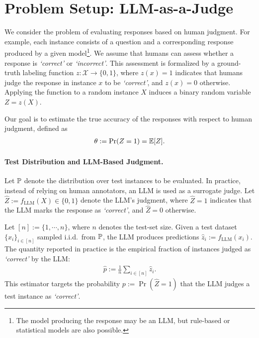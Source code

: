 \section{Problem Setup: LLM-as-a-Judge}
We consider the problem of evaluating responses based on human judgment. For example, each instance consists of a question and a corresponding response produced by a given model\footnote{The model producing the response may be an LLM, but rule-based or statistical models are also possible.}. We assume that humans can assess whether a response is \emph{`correct'} or \emph{`incorrect'}. This assessment is formalized by a ground-truth labeling function $z : \mathcal{X} \to \{0,1\}$, where $z(x)=1$ indicates that humans judge the response in instance $x$ to be \emph{`correct'}, and $z(x)=0$ otherwise. Applying the function to a random instance $X$ induces a binary random variable $Z = z(X)$.

Our goal is to estimate the true accuracy of the responses with respect to human judgment, defined as
\begin{align}
    \theta := \mathop{\rm Pr}\nolimits(Z = 1) = \displaystyle \mathbb{E}[Z].
    \label{eq:theta}
\end{align}

\paragraph{Test Distribution and LLM-Based Judgment.}
Let ${\mathbb{P}}$ denote the distribution over test instances to be evaluated. In practice, instead of relying on human annotators, an LLM is used as a surrogate judge. Let $\hat{Z} := f_{\mathrm{LLM}}(X) \in \{0,1\}$ denote the LLM’s judgment, where $\hat{Z}=1$ indicates that the LLM marks the response as \emph{`correct'}, and $\hat{Z}=0$ otherwise.

Let $[n] := \{1, \cdots, n\}$, where $n$ denotes the test-set size. Given a test dataset $\{x_i\}_{i\in[n]}$ sampled i.i.d.\ from ${\mathbb{P}}$, the LLM produces predictions $\hat{z}_i := f_{\mathrm{LLM}}(x_i)$. The quantity reported in practice is the empirical fraction of instances judged as \emph{`correct'} by the LLM:
\begin{align}
    \hat{p} := \frac{1}{n} \sum_{i\in[n]} \hat{z}_i .
    \label{eq:avg-pred}
\end{align}
This estimator targets the probability $p := \Pr(\hat{Z} = 1)$ that the LLM judges a test instance as \emph{`correct'}.

